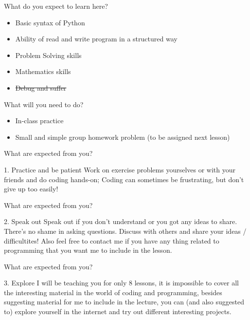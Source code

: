\documentclass[10pt,xcolor={table,dvipsnames},t]{beamer}
\begin{document}
\begin{frame}{What do you expect to learn here?}
  \begin{itemize}
    \item Basic syntax of Python
    \item Ability of read and write program in a structured way
    \item Problem Solving skills
    \item Mathematics skills
    \item \sout{Debug and suffer}
  \end{itemize}
\end{frame}

\begin{frame}{What will you need to do?}
  \begin{itemize}
    \item In-class practice
    \item Small and simple group homework problem (to be assigned next lesson)
  \end{itemize}
\end{frame}

\begin{frame}{What are expected from you?}
  \begin{block}{1. Practice and be patient}
    Work on exercise problems yourselves or with your friends and do coding hands-on; Coding can sometimes be frustrating, but don't give up too easily!
  \end{block}
\end{frame}
\begin{frame}{What are expected from you?}
  \begin{block}{2. Speak out}
    Speak out if you don't understand or you got any ideas to share. There's no shame in asking questions. Discuss with others and share your ideas / difficultites! Also feel free to contact me if you have any thing related to programming that you want me to include in the lesson.
  \end{block}
\end{frame}
\begin{frame}{What are expected from you?}
  \begin{block}{3. Explore}
    I will be teaching you for only 8 lessons, it is impossible to cover all the interesting material in the world of coding and programming, besides suggesting material for me to include in the lecture, you can (and also suggested to) explore yourself in the internet and try out different interesting projects.
  \end{block}
\end{frame}
\end{document}
